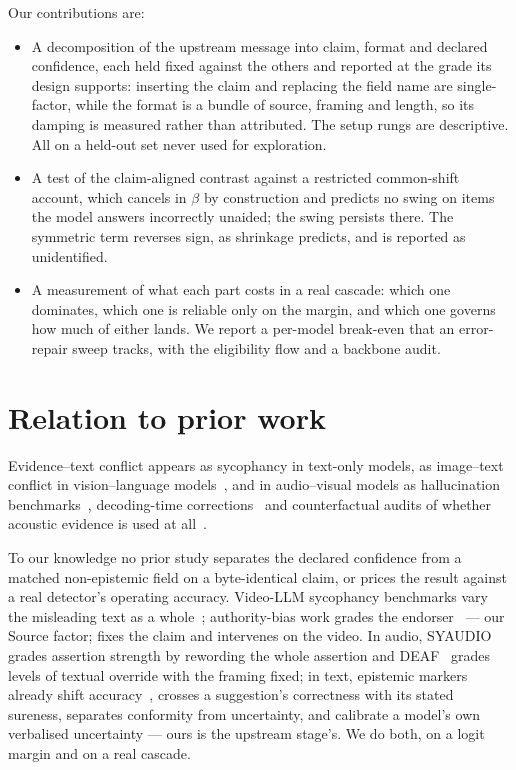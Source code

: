Our contributions are:
\begin{itemize}\itemsep2pt
\item A decomposition of the upstream message into claim, format
and declared confidence, each held fixed against the others and reported at the grade its
design supports: inserting the claim and replacing the field name are single-factor, while the
format is a bundle of source, framing and length, so its damping is measured rather than
attributed. The setup rungs are descriptive. All on a held-out set never used for
exploration.
\item A test of the claim-aligned contrast against a restricted common-shift account, which
cancels in $\beta$ by construction and predicts no swing on items the model answers
incorrectly unaided; the swing persists there. The symmetric term reverses sign, as
shrinkage predicts, and is reported as \mbox{unidentified}.
\item A measurement of what each part costs in a real cascade:
which one dominates, which one is reliable only on the margin, and which one governs how much of
either lands. We report a per-model break-even that an error-repair sweep tracks, with the
eligibility flow and a backbone audit.
\end{itemize}

\section{Relation to prior work}
\label{sec:related}

Evidence--text conflict appears as sycophancy in text-only models, as image--text conflict in
vision--language models~\cite{liu2025vlmcognitive}, and in audio--visual models as hallucination
benchmarks~\cite{kim2024avhbench,chen2026avid,wang2026avibench}, decoding-time
corrections~\cite{leng2024vcd,jung2025avcd,gacl2026} and counterfactual audits of whether
acoustic evidence is used at
all~\cite{miller2026paralinguistic,singh2024counterfactualav,chen2025listen,alme2026,wang2025mcrbench,dong2026omnihallucl}.

To our knowledge no prior study separates the declared confidence from a matched
non-epistemic field on a byte-identical claim, or prices the result against a real detector's operating accuracy.
Video-LLM sycophancy benchmarks vary the misleading text as
a whole~\cite{zhou2025flattery,tang2026spatiotemporal}; authority-bias work grades
the endorser~\cite{mammen2026endorsed,joswin2026mechanistic} --- our Source factor; \cite{cao2026caved} fixes the claim and intervenes on the video. In audio, SYAUDIO~\cite{yao2026syaudio} grades assertion strength by rewording the whole
assertion and DEAF~\cite{xiong2026deaf} grades levels of textual override with the framing
fixed; in text, epistemic markers already shift accuracy~\cite{zhou2023navigating},
\cite{sicilia2025sycophancy} crosses a suggestion's correctness with its stated sureness, \cite{guo2026conformity}
separates conformity from uncertainty, and \cite{lin2022teaching,tian2023just}
calibrate a model's own verbalised uncertainty --- ours is the upstream stage's. We do both, on a
logit margin and on a real cascade.

